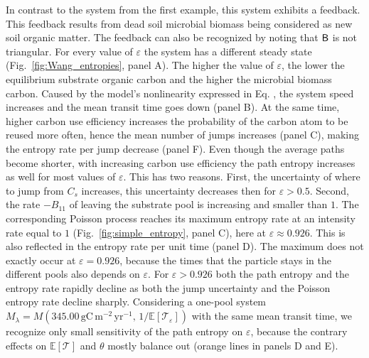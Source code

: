 \documentclass[smallextended]{svjour3}
\makeatletter
\renewcommand*{\eqref}[1]{%
  \hyperref[{#1}]{\textup{\tagform@{\ref*{#1}}}}%
}
\newcommand{\E}{\mathbb{E}}
\newcommand{\TT}{\mathcal{T}}
\newcommand{\gC}{\mathrm{gC}}
\newcommand{\yr}{\mathrm{yr}}
\newcommand{\meter}{\mathrm{m}}
\makeatother
\begin{document}
In contrast to the system from the first example, this system exhibits a feedback.
This feedback results from dead soil microbial biomass being considered as new soil organic matter.
The feedback can also be recognized by noting that $\mathsf{B}$ is not triangular.
For every value of $\varepsilon$ the system has a different steady state (Fig.~\ref{fig:Wang_entropies}, panel A).
The higher the value of $\varepsilon$, the lower the equilibrium substrate organic carbon and the higher the microbial biomass carbon.
Caused by the model's nonlinearity expressed in Eq. \eqref{eqn:lambdax}, the system speed increases and the mean transit time goes down (panel B).
At the same time, higher carbon use efficiency increases the probability of the carbon atom to be reused more often, hence the mean number of jumps increases (panel C), making the entropy rate per jump decrease (panel F).
Even though the average paths become shorter, with increasing carbon use efficiency the path entropy increases as well for most values of $\varepsilon$.
This has two reasons.
First, the uncertainty of where to jump from $C_s$ increases, this uncertainty decreases then for $\varepsilon>0.5$.
Second, the rate $-B_{11}$ of leaving the substrate pool is increasing and smaller than $1$.
The corresponding Poisson process reaches its maximum entropy rate at an intensity rate equal to $1$ (Fig.~\ref{fig:simple_entropy}, panel C), here at $\varepsilon\approx0.926$.
This is also reflected in the entropy rate per unit time (panel D).
The maximum does not exactly occur at $\varepsilon=0.926$, because the times that the particle stays in the different pools also depends on $\varepsilon$.
For $\varepsilon>0.926$ both the path entropy and the entropy rate rapidly decline as both the jump uncertainty and the Poisson entropy rate decline sharply.
Considering a one-pool system $M_\lambda=M(345.00\,\gC\,\meter^{-2}\,\yr^{-1},\, 1/\E\left[\TT_\varepsilon\right])$ with the same mean transit time, we recognize only small sensitivity of the path entropy on $\varepsilon$, because the contrary effects on $\E\left[\TT\right]$ and $\theta$ mostly balance out (orange lines in panels D and E).
\end{document}
